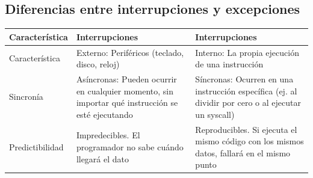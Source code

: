 \documentclass[]{article}
\begin{document}
	\subsection{Diferencias entre interrupciones y excepciones}
		\begin{tabular}{|>{\centering\arraybackslash}m{2.5cm}|>{\centering\arraybackslash}m{4cm}|>{\centering\arraybackslash}m{4cm}|}
			\hline
			Característica & Interrupciones & Interrupciones \\
			\hline
			Característica & Externo: Periféricos (teclado, disco, reloj) & Interno: La propia ejecución de una instrucción \\
			\hline
			Sincronía & Asíncronas: Pueden ocurrir en cualquier momento, sin importar qué instrucción se esté ejecutando & Síncronas: Ocurren en una instrucción específica (ej. al dividir por cero o al ejecutar un syscall) \\
			\hline
			Predictibilidad & Impredecibles. El programador no sabe cuándo llegará el dato & Reproducibles. Si ejecuta el mismo código con los mismos datos, fallará en el mismo punto \\
			\hline
		\end{tabular}
\end{document}

